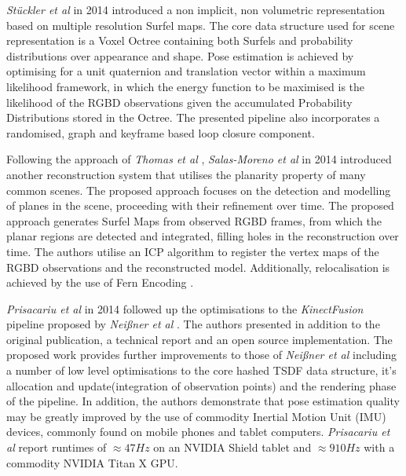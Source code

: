 {\textit{St{\"u}ckler et al} \cite{Stuckler2014} in 2014 introduced a non implicit, non volumetric 
representation based on multiple resolution Surfel \cite{Pfister2000} maps. The core data structure 
used for scene representation is a Voxel Octree \cite{Laine2010} containing both Surfels and 
probability distributions over appearance and shape. Pose estimation is achieved by optimising for 
a unit quaternion \cite{Mukundan2002} and translation vector within a maximum likelihood framework, 
in which the energy function to be maximised is the likelihood of the RGBD observations given the 
accumulated Probability Distributions stored in the Octree. The presented pipeline also incorporates 
a randomised, graph and keyframe based loop closure component.

Following the approach of \textit{Thomas et al} \cite{Thomas2013}, \textit{Salas-Moreno et al} 
\cite{Salas-Moreno2014} in 2014 introduced another reconstruction system that utilises the
planarity property of many common scenes. The proposed approach focuses on the detection and 
modelling of planes in the scene, proceeding with their refinement over time. 
The proposed approach generates Surfel \cite{Pfister2000} Maps from observed RGBD frames, from 
which the planar regions are detected and integrated, filling holes in the reconstruction over time.
The authors utilise an ICP algorithm to register the vertex maps of the RGBD observations and the 
reconstructed model. Additionally, relocalisation is achieved by the use of Fern Encoding 
\cite{Glocker2014}. 

\textit{Prisacariu et al} \cite{Prisacariu2014, Kahler2015} in 2014 followed up the optimisations 
to the \textit{KinectFusion} pipeline proposed by \textit{Nei{\ss}ner et al} \cite{NieBner2013}. 
The authors presented in addition to the original publication, a technical report and an open 
source implementation. The proposed work provides further improvements to those of 
\textit{Nei{\ss}ner et al} \cite{NieBner2013} including a number of low level optimisations to the 
core hashed TSDF data structure, it's allocation and update(integration of observation points) and 
the rendering phase of the pipeline. In addition, the authors demonstrate that pose estimation quality 
may be greatly improved by the use of commodity Inertial Motion Unit (IMU) devices, commonly found 
on mobile phones and tablet computers. \textit{Prisacariu et al} report runtimes of 
$\approx47Hz$ on an NVIDIA Shield tablet and $\approx910Hz$ with a commodity NVIDIA Titan X GPU.

}
